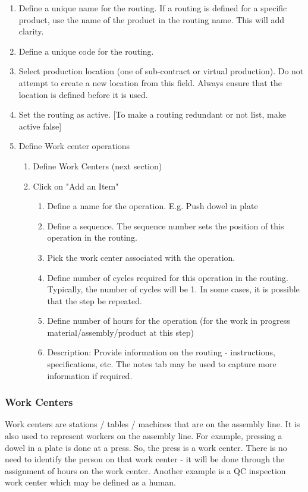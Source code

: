 \begin{enumerate}
\item Define a unique name for the routing. If a routing is defined for a specific product, use the name of the product in the routing name. This will add clarity.
\item Define a unique code for the routing.
\item Select production location (one of sub-contract or virtual production). Do not attempt to create a new location from this field. Always ensure that the location is defined before it is used.
\item Set the routing as active. [To make a routing redundant or not list, make active false]
\item Define Work center operations 
\begin{enumerate}
  \item Define Work Centers (next section)
  \item Click on "Add an Item" 
\begin{enumerate}
    \item Define a name for the operation. E.g. Push dowel in plate
    \item Define a sequence. The sequence number sets the position of this operation in the routing.
    \item Pick the work center associated with the operation.
    \item Define number of cycles required for this operation in the routing. Typically, the number of cycles will be 1. In some cases, it is possible that the step be repeated.
    \item Define number of hours for the operation (for the work in progress material/assembly/product at this step)
    \item Description: Provide information on the routing - instructions, specifications, etc. The notes tab may be used to capture more information if required.
\end{enumerate}
\end{enumerate}
\end{enumerate}

\subsubsection{Work Centers}
Work centers are stations / tables / machines that are on the assembly line. It is also used to represent workers on the assembly line. For example, pressing a dowel in a plate is done at a press. So, the press is a work center. There is no need to identify the person on that work center - it will be done through the assignment of hours on the work center. Another example is a QC inspection work center which may be defined as a human.

